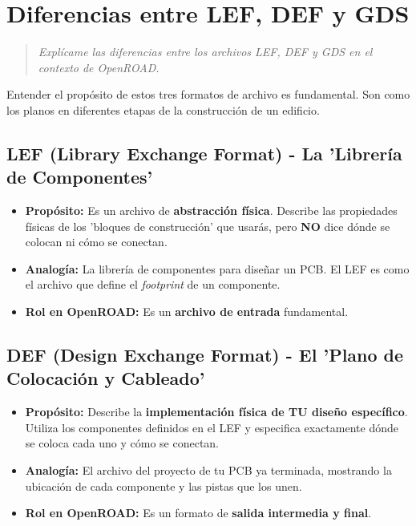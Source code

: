\documentclass[12pt,a4paper]{article}
\newenvironment{pregunta}
  {\begin{leftbar}\begin{quote}\itshape}
  {\end{quote}\end{leftbar}}
\begin{document}
\newpage
\section{Diferencias entre LEF, DEF y GDS}

\begin{pregunta}
Explícame las diferencias entre los archivos LEF, DEF y GDS en el contexto de OpenROAD.
\end{pregunta}

Entender el propósito de estos tres formatos de archivo es fundamental. Son como los planos en diferentes etapas de la construcción de un edificio.

\subsection{LEF (Library Exchange Format) - La 'Librería de Componentes'}
\begin{itemize}
    \item \textbf{Propósito:} Es un archivo de \textbf{abstracción física}. Describe las propiedades físicas de los 'bloques de construcción' que usarás, pero \textbf{NO} dice dónde se colocan ni cómo se conectan.
    \item \textbf{Analogía:} La librería de componentes para diseñar un PCB. El LEF es como el archivo que define el \textit{footprint} de un componente.
    \item \textbf{Rol en OpenROAD:} Es un \textbf{archivo de entrada} fundamental.
\end{itemize}

\subsection{DEF (Design Exchange Format) - El 'Plano de Colocación y Cableado'}
\begin{itemize}
    \item \textbf{Propósito:} Describe la \textbf{implementación física de TU diseño específico}. Utiliza los componentes definidos en el LEF y especifica exactamente dónde se coloca cada uno y cómo se conectan.
    \item \textbf{Analogía:} El archivo del proyecto de tu PCB ya terminada, mostrando la ubicación de cada componente y las pistas que los unen.
    \item \textbf{Rol en OpenROAD:} Es un formato de \textbf{salida intermedia y final}.
\end{itemize}
\end{document}

